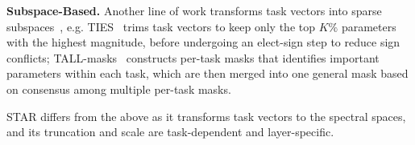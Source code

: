 \noindent\textbf{Subspace-Based.} Another line of work transforms task vectors into sparse subspaces~\cite{davari2023model,yadav2024ties,wang2024localizing, huang2024emr},
e.g. TIES~\cite{yadav2024ties} trims task vectors to keep only the top \(K\%\) parameters with the highest magnitude, before undergoing an elect-sign step to reduce sign conflicts; TALL-masks~\cite{wang2024localizing} constructs per-task masks that identifies important parameters within each task, which are then merged into one general mask based on consensus among multiple per-task masks.

STAR differs from the above as it transforms task vectors to the spectral spaces, and its truncation and scale are task-dependent and layer-specific. 
